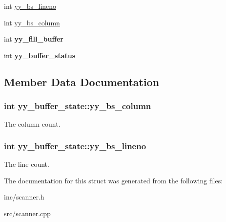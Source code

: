 \begin{DoxyCompactItemize}
\item 
int \hyperlink{structyy__buffer__state_a818e94bc9c766e683c60df1e9fd01199}{yy\+\_\+bs\+\_\+lineno}
\item 
int \hyperlink{structyy__buffer__state_a10c4fcd8be759e6bf11e6d3e8cdb0307}{yy\+\_\+bs\+\_\+column}
\item 
\hypertarget{structyy__buffer__state_a63d2afbb1d79a3fc63df9e12626f827d}{}int {\bfseries yy\+\_\+fill\+\_\+buffer}\label{structyy__buffer__state_a63d2afbb1d79a3fc63df9e12626f827d}

\item 
\hypertarget{structyy__buffer__state_a70fd925d37a2f0454fbd0def675d106c}{}int {\bfseries yy\+\_\+buffer\+\_\+status}\label{structyy__buffer__state_a70fd925d37a2f0454fbd0def675d106c}

\end{DoxyCompactItemize}


\subsection{Member Data Documentation}
\hypertarget{structyy__buffer__state_a10c4fcd8be759e6bf11e6d3e8cdb0307}{}
\subsubsection[{yy\+\_\+bs\+\_\+column}]{\setlength{\rightskip}{0pt plus 5cm}int yy\+\_\+buffer\+\_\+state\+::yy\+\_\+bs\+\_\+column}\label{structyy__buffer__state_a10c4fcd8be759e6bf11e6d3e8cdb0307}
The column count. \hypertarget{structyy__buffer__state_a818e94bc9c766e683c60df1e9fd01199}{}
\subsubsection[{yy\+\_\+bs\+\_\+lineno}]{\setlength{\rightskip}{0pt plus 5cm}int yy\+\_\+buffer\+\_\+state\+::yy\+\_\+bs\+\_\+lineno}\label{structyy__buffer__state_a818e94bc9c766e683c60df1e9fd01199}
The line count. 

The documentation for this struct was generated from the following files\+:\begin{DoxyCompactItemize}
\item 
inc/scanner.\+h\item 
src/scanner.\+cpp\end{DoxyCompactItemize}
